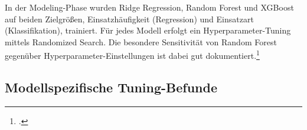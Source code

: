 \documentclass[12pt,a4paper]{article}
\begin{document}

In der Modeling-Phase wurden Ridge Regression, Random Forest und XGBoost auf beiden Zielgrößen,
Einsatzhäufigkeit (Regression) und Einsatzart (Klassifikation), trainiert. Für jedes Modell erfolgt
ein Hyperparameter-Tuning mittels Randomized Search. Die besondere Sensitivität von Random Forest
gegenüber Hyperparameter-Einstellungen ist dabei gut dokumentiert.\footcite[166]{Probst2019}


\subsection{Modellspezifische Tuning-Befunde}

\end{document}
